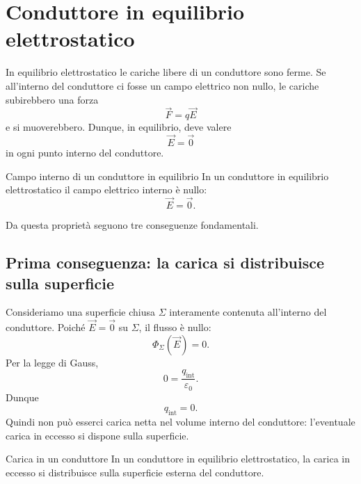 \documentclass[a4paper]{article}
\begin{document}
\begin{center}
\end{center}

\section{Conduttore in equilibrio elettrostatico}

In equilibrio elettrostatico le cariche libere di un conduttore sono ferme. Se all'interno del conduttore ci fosse un campo elettrico non nullo, le cariche subirebbero una forza
\[
    \vec{F}=q\vec{E}
\]
e si muoverebbero. Dunque, in equilibrio, deve valere
\[
    \vec{E}=\vec{0}
\]
in ogni punto interno del conduttore.

\begin{snippettheorem}{Campo interno di un conduttore in equilibrio}
    In un conduttore in equilibrio elettrostatico il campo elettrico interno è nullo:
    \[
        \vec{E}=\vec{0}.
    \]
\end{snippettheorem}

Da questa proprietà seguono tre conseguenze fondamentali.

\subsection{Prima conseguenza: la carica si distribuisce sulla superficie}

Consideriamo una superficie chiusa \(\Sigma\) interamente contenuta all'interno del conduttore. Poiché \(\vec{E}=\vec{0}\) su \(\Sigma\), il flusso è nullo:
\[
    \Phi_\Sigma(\vec{E})=0.
\]
Per la legge di Gauss,
\[
    0=\frac{q_{\mathrm{int}}}{\varepsilon_0}.
\]
Dunque
\[
    q_{\mathrm{int}}=0.
\]
Quindi non può esserci carica netta nel volume interno del conduttore: l'eventuale carica in eccesso si dispone sulla superficie.

\begin{snippetproposition}{Carica in un conduttore}
    In un conduttore in equilibrio elettrostatico, la carica in eccesso si distribuisce sulla superficie esterna del conduttore.
\end{snippetproposition}
\end{document}
